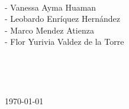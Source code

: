 \begin{titlepage}
	\begin{minipage}{0.4\textwidth}
		\begin{flushleft} \large
			\emph{}\\
- Vanessa Ayma Huaman \\
- Leobardo Enríquez Hernández\\
- Marco Mendez Atienza\\
- Flor Yurivia Valdez de la Torre\\
		\end{flushleft}
	\end{minipage}
	~

	~
	
	
	{\today}\\[2cm] %
	
	

	
	
	\vfill %
	
\end{titlepage}